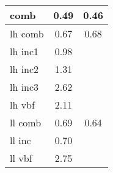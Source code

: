\documentclass{beamer}
\begin{document}
\begin{frame}
\begin{normalsize}
\begin{minipage}{\textwidth}
\begin{minipage}[c]{0.19\textwidth}
\begin{table}
{{\begin{tabular}{| l | c | c |}
comb      &    0.49          &    0.46	            \\\hline
lh comb   &    0.67          &    0.68		           \\\hline
lh inc1     &      0.98          &               \\\hline
lh inc2     &   1.31           &               \\\hline
lh inc3     &    2.62           &               \\\hline
lh vbf     &      2.11         &               \\\hline
ll comb     &     0.69        &  0.64		             \\\hline
ll inc     &      0.70       &               \\\hline
ll vbf     &       2.75        &               \\\hline
\end{tabular}
}}
\end{table}
\end{minipage}
\end{minipage}
\end{normalsize}
\end{frame}
\end{document}
